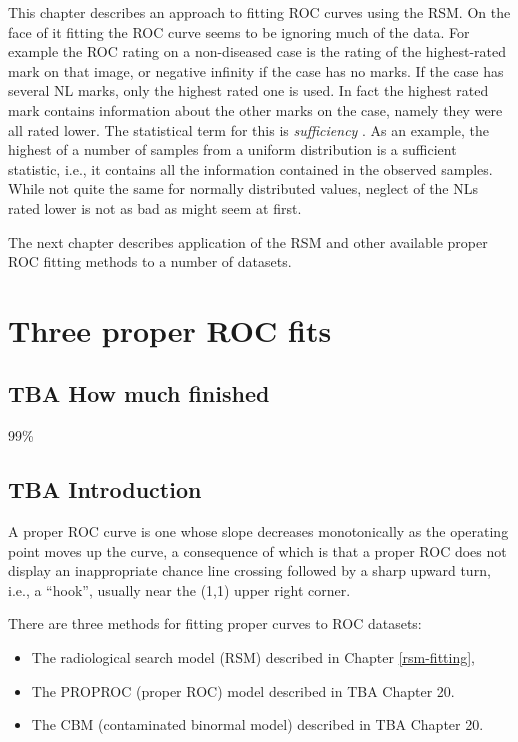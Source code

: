 \documentclass[
]{book}
\providecommand{\tightlist}{%
  \setlength{\itemsep}{0pt}\setlength{\parskip}{0pt}}
\begin{document}
This chapter describes an approach to fitting ROC curves using the RSM. On the face of it fitting the ROC curve seems to be ignoring much of the data. For example the ROC rating on a non-diseased case is the rating of the highest-rated mark on that image, or negative infinity if the case has no marks. If the case has several NL marks, only the highest rated one is used. In fact the highest rated mark contains information about the other marks on the case, namely they were all rated lower. The statistical term for this is \emph{sufficiency} \citep{larsen2005introduction}. As an example, the highest of a number of samples from a uniform distribution is a sufficient statistic, i.e., it contains all the information contained in the observed samples. While not quite the same for normally distributed values, neglect of the NLs rated lower is not as bad as might seem at first.

The next chapter describes application of the RSM and other available proper ROC fitting methods to a number of datasets.

\hypertarget{rsm-3-fits}{%
\chapter{Three proper ROC fits}\label{rsm-3-fits}}

\hypertarget{rsm-3-fits-how-much-finished}{%
\section{TBA How much finished}\label{rsm-3-fits-how-much-finished}}

99\%

\hypertarget{rsm-3-fits-intro}{%
\section{TBA Introduction}\label{rsm-3-fits-intro}}

A proper ROC curve is one whose slope decreases monotonically as the operating point moves up the curve, a consequence of which is that a proper ROC does not display an inappropriate chance line crossing followed by a sharp upward turn, i.e., a ``hook'', usually near the (1,1) upper right corner.

There are three methods for fitting proper curves to ROC datasets:

\begin{itemize}
\tightlist
\item
  The radiological search model (RSM) described in Chapter \ref{rsm-fitting},
\item
  The PROPROC (proper ROC) model described in TBA Chapter 20.
\item
  The CBM (contaminated binormal model) described in TBA Chapter 20.
\end{itemize}
\end{document}
